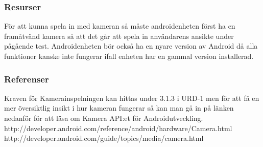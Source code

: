 \subsubsection{Resurser}
För att kunna spela in med kameran så måste androidenheten först ha en framåtvänd kamera så att det går att spela in användarens ansikte under pågående test. Androidenheten bör också ha en nyare version av Android då alla funktioner kanske inte fungerar ifall enheten har en gammal version installerad.

\subsubsection{Referenser}
Kraven för Kamerainspelningen kan hittas under 3.1.3 i URD-1 men för att få en mer översiktlig insikt i hur kameran fungerar så kan man gå in på länken nedanför för att läsa om Kamera API:et för Androidutveckling.
http://developer.android.com/reference/android/hardware/Camera.html
http://developer.android.com/guide/topics/media/camera.html


